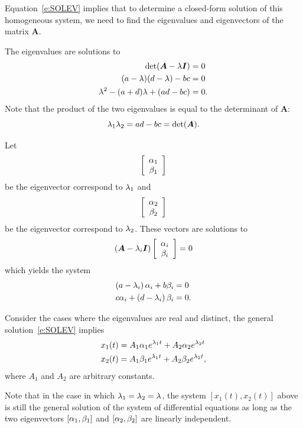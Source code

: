 \documentclass[letterpaper, 11pt, leqno]{article}
\begin{document}
Equation~\eqref{e:SOLEV} implies that to determine a closed-form solution of this homogeneous system, we need to find the eigenvalues and eigenvectors of the matrix $\bm{A}$.

The eigenvalues are solutions to 
\begin{align*}
\det(\bm{A}-\lambda \bm{I}) &=0\\
(a-\lambda) (d-\lambda) -b c &=0 \\
\lambda ^{2}- (a+d) \lambda + (ad-bc) &=0.
\end{align*}
Note that the product of the two eigenvalues is equal to the determinant of $
\bm{A}$:
\begin{equation}
\lambda_{1} \lambda_{2}=a d-b c=\det(\bm{A}).\label{e:DETL}
\end{equation}

Let 
\begin{equation*}\left[ 
\begin{array}{c}
\alpha_{1} \\ 
\beta_{1}
\end{array} \right]\end{equation*}
be the eigenvector correspond to $\lambda_{1}$ and 
\begin{equation*}\left[ 
\begin{array}{c}
\alpha_{2} \\ 
\beta_{2}
\end{array} \right]\end{equation*}
 be the eigenvector correspond to $\lambda_{2}$. These vectors are solutions to 
\begin{equation*}
\left( \bm{A}-\lambda_{i}\bm{I} \right) \left[ 
\begin{array}{c}
\alpha_{i} \\ 
\beta_{i}
\end{array} \right] =0
\end{equation*}
which yields the system
\begin{align*}
\left( a-\lambda_{i} \right) \alpha_{i}+b \beta _{i} &=0 \\
c \alpha_{i}+\left( d-\lambda_{i} \right) \beta _{i} &=0.
\end{align*}

Consider the cases where the eigenvalues are real and distinct, the general
solution~\eqref{e:SOLEV} implies
\begin{align*}
x_{1}(t) &=A_{1} \alpha_{1} e^{\lambda_{1} t}+A_{2} \alpha_{2} e^{\lambda_{2} t}\\
x_{2}(t) &=A_{1} \beta_{1} e^{\lambda_{1} t}+A_{2} \beta_{2} e^{\lambda_{2} t},
\end{align*}
where $A_{1}$ and $A_{2}$ are arbitrary constants. 

Note that in the case in which $\lambda_{1}=\lambda_{2}=\lambda$, the system $[x_{1}(t),x_{2}(t)]$ above is still the general solution of the system of differential equations as long as the two eigenvectors $[\alpha_{1},\beta_{1}]$ and $[\alpha_{2},\beta_{2}]$ are linearly independent.
\end{document}
